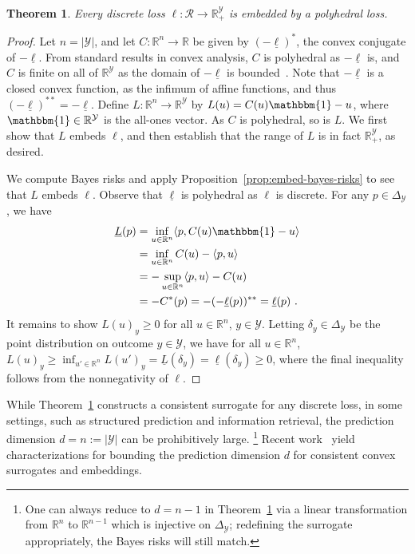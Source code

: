 \documentclass[11pt]{article}
\newcommand{\Comments}{1}
\newcommand{\mynote}[2]{\ifnum\Comments=1\textcolor{#1}{#2}\fi}
\newcommand{\mytodo}[2]{\ifnum\Comments=1%
  \todo[linecolor=#1!80!black,backgroundcolor=#1,bordercolor=#1!80!black]{#2}\fi}
\newcommand{\raft}[1]{\mytodo{green!20!white}{RF: #1}}
\newcommand{\jessie}[1]{\mynote{teal}{[JF: #1]}}
\newcommand{\reals}{\mathbb{R}}
\newcommand{\simplex}{\Delta_\Y}
\newcommand{\R}{\mathcal{R}}
\newcommand{\Y}{\mathcal{Y}}
\newcommand{\risk}[1]{\underline{#1}}
\newcommand{\inprod}[2]{\langle #1, #2 \rangle}%
\newcommand{\ones}{\mathbbm{1}}
\newtheorem{theorem}{Theorem}
\begin{document}
\begin{theorem}\label{thm:discrete-loss-poly-embeddable}
  Every discrete loss $\ell:\R \to \reals^\Y_+$ is embedded by a polyhedral loss.
\end{theorem}
\begin{proof}
  Let $n = |\Y|$, and let $C:\reals^n \to \reals$ be given by $(-\risk{\ell})^*$, the convex conjugate of $-\risk{\ell}$.
  From standard results in convex analysis, $C$ is polyhedral as $-\risk{\ell}$ is, and $C$ is finite on all of $\reals^\Y$ as the domain of $-\risk{\ell}$ is bounded~\cite[Corollary 13.3.1]{rockafellar1997convex}.
  Note that $-\risk{\ell}$ is a closed convex function, as the infimum of affine functions, and thus $(-\risk{\ell})^{**} = -\risk{\ell}$.
  Define $L:\reals^n\to\reals^\Y$ by $L(u) = C(u)\ones - u$, where $\ones\in\reals^\Y$ is the all-ones vector.
  As $C$ is polyhedral, so is $L$.
  We first show that $L$ embeds $\ell$, and then establish that the range of $L$ is in fact $\reals^\Y_+$, as desired.

  We compute Bayes risks and apply Proposition~\ref{prop:embed-bayes-risks} to see that $L$ embeds $\ell$.
  Observe that $\risk{\ell}$ is polyhedral as $\ell$ is discrete.
  For any $p\in\simplex$, we have
  \begin{align*}
    \risk{L}(p)
    &= \inf_{u\in\reals^n} \inprod{p}{C(u)\ones - u}\\
    &= \inf_{u\in\reals^n} C(u) - \inprod{p}{u}\\
    &= -\sup_{u\in\reals^n} \inprod{p}{u} - C(u)\\
    &= -C^*(p) = - (-\risk{\ell}(p))^{**} = \risk{\ell}(p)~.
  \end{align*}
  It remains to show $L(u)_y \geq 0$ for all $u\in\reals^n$, $y\in\Y$.
  Letting $\delta_y\in\simplex$ be the point distribution on outcome $y\in\Y$, we have for all $u\in\reals^n$, $L(u)_y \geq \inf_{u'\in\reals^n} L(u')_y = \risk{L}(\delta_y) = \risk{\ell}(\delta_y) \geq 0$, where the final inequality follows from the nonnegativity of $\ell$.
\end{proof}

While Theorem~\ref{thm:discrete-loss-poly-embeddable} constructs a consistent surrogate for any discrete loss, in some settings, such as structured prediction and information retrieval, the prediction dimension $d = n := |\Y|$ can be prohibitively large.%
\footnote{One can always reduce to $d=n-1$ in Theorem~\ref{thm:discrete-loss-poly-embeddable} via a linear transformation from $\reals^n$ to $\reals^{n-1}$ which is injective on $\simplex$; redefining the surrogate appropriately, the Bayes risks will still match.}
Recent work~\citep{ramaswamy2016convex,finocchiaro2020embedding,finocchiaro2021unifying} yield characterizations for bounding the prediction dimension $d$ for consistent convex surrogates and embeddings.
\end{document}
